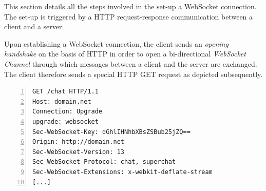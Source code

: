 \documentclass[a4paper, justified, notoc]{tufte-handout} %
\begin{document}
This section details all the steps involved in the set-up a WebSocket connection. The set-up is triggered by a HTTP request-response communication between a client and a server.

Upon establishing a WebSocket connection, the client sends an \emph{opening handshake} on the basis of HTTP in order to open a bi-directional \emph{WebSocket Channel} through which messages between a client and the server are exchanged. The client therefore sends a special HTTP GET request as depicted subsequently.

\newpage
\begin{Verbatim}[gobble=0,frame=lines,numbers=left]
GET /chat HTTP/1.1
Host: domain.net
Connection: Upgrade
upgrade: websocket
Sec-WebSocket-Key: dGhlIHNhbXBsZSBub25jZQ== 
Origin: http://domain.net
Sec-WebSocket-Version: 13
Sec-WebSocket-Protocol: chat, superchat 
Sec-WebSocket-Extensions: x-webkit-deflate-stream 
[...]
\end{Verbatim}

\end{document}
